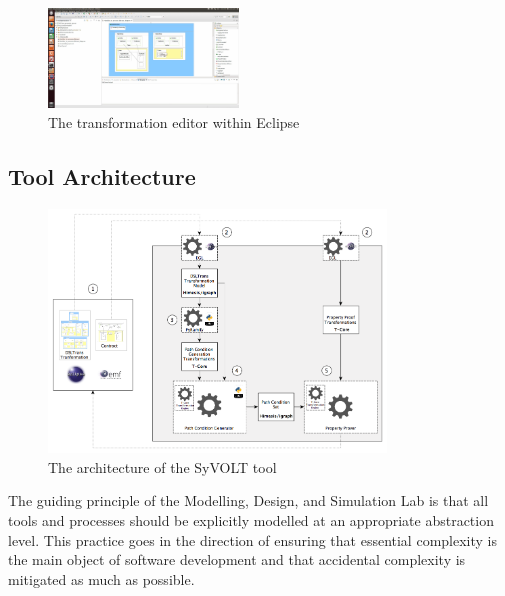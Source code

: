 
\begin{figure}
\centering
\includegraphics[width=0.45\textwidth]{figures/syvolt_prover/eclipse_frontend}
\caption{The transformation editor within Eclipse}
\label{fig:eclipse_frontend}
\end{figure}

\subsection{Tool Architecture}
\begin{figure}
\centering
\includegraphics[width=0.8\textwidth]{figures/syvolt_prover/tooling_arch}
\caption{The architecture of the SyVOLT tool}
\label{fig:arch}
\end{figure}

The guiding principle of the Modelling, Design, and Simulation Lab is that all tools and processes should be
explicitly modelled at an appropriate abstraction level. This
practice goes in the direction of ensuring that essential complexity is the main
object of software development and that accidental complexity is mitigated as
much as possible.

